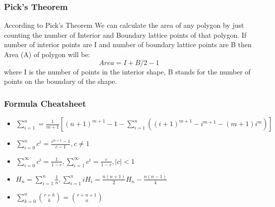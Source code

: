 \subsubsection{Pick's Theorem}

According to Pick’s Theorem We can calculate the area of any polygon by just counting the number of Interior and Boundary lattice points of that polygon. If number of interior points are I and number of boundary lattice points are B then Area (A) of polygon will be:$$Area = I + B/2 - 1$$where I is the number of points in the interior shape, B stands for the number of points on the boundary of the shape.
\subsubsection{Formula Cheatsheet}

\begin{itemize}
  \setlength{\itemsep}{0.2ex}
  \setlength{\topsep}{0.3ex}
  \setlength{\parsep}{0pt}
  \setlength{\partopsep}{0pt}
    \item $\sum\limits_{i=1}^n = \frac{1}{m+1}[(n+1)^{m+1} - 1 - \sum\limits_{i=1}^n((i+1)^{m+1}-i^{m+1}-(m+1)i^m)]$

    \item $\sum\limits_{i=0}^nc^i = \frac{c^{n+1}-1}{c-1}, c\neq 1$

    \item $\sum\limits_{i=0}^\infty c^i = \frac{1}{1-c}, \sum\limits_{i=1}^\infty c^i = \frac{c}{1-c}, |c|< 1$

    \item $H_n = \sum\limits_{i=1}^n \frac{1}{n}, \sum\limits_{i=1}^n iH_i = \frac{n(n+1)}{2}H_n - \frac{n(n-1)}{4}$

    \item $\sum\limits_{k=0}^n\binom{r+k}{k} =\binom{r+n+1}{n}$
   
\end{itemize}
